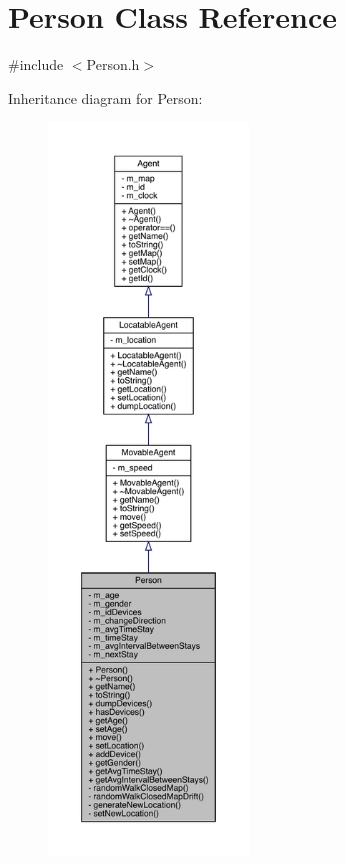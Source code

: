 \hypertarget{class_person}{}\section{Person Class Reference}
\label{class_person}


{\ttfamily \#include $<$Person.\+h$>$}



Inheritance diagram for Person\+:\nopagebreak
\begin{figure}[H]
\begin{center}
\leavevmode
\includegraphics[height=550pt]{class_person__inherit__graph}
\end{center}
\end{figure}


